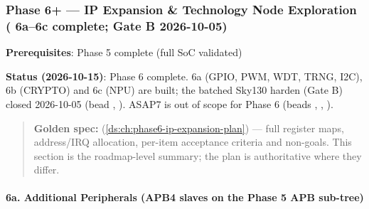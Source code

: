 \subsubsection{\texorpdfstring{Phase 6+ --- IP Expansion \& Technology
Node Exploration (\ok{} 6a--6c complete; Gate B \ok{}
2026-10-05)}{Phase 6+ --- IP Expansion \& Technology Node Exploration ( 6a--6c complete; Gate B  2026-10-05)}}\label{cr:status:roadmap:phase-6-ip-expansion-technology-node-exploration-white-check-mark-6a6c-complete-gate-b-white-check-mark-2026-10-05}

\begin{record}

\textbf{Prerequisites}: Phase 5 complete (full SoC validated)

\textbf{Status (2026-10-15)}: Phase 6 complete. 6a (GPIO, PWM, WDT,
TRNG, I2C), 6b (CRYPTO) and 6c (NPU) are built; the batched Sky130
harden (Gate B) closed 2026-10-05 (bead , ). ASAP7
is out of scope for Phase 6 (beads , , ).

\begin{quote}
\textbf{Golden spec:}  (\cref{ds:ch:phase6-ip-expansion-plan}) --- full
register maps, address/\allowbreak{}IRQ allocation, per-item acceptance
criteria and non-goals. This section is the roadmap-level summary; the
plan is authoritative where they differ.
\end{quote}

\end{record}

\paragraph{6a. Additional Peripherals (APB4 slaves on the Phase 5 APB
sub-tree)}\label{cr:status:roadmap:6a-additional-peripherals-apb4-slaves-on-the-phase-5-apb-sub-tree}

